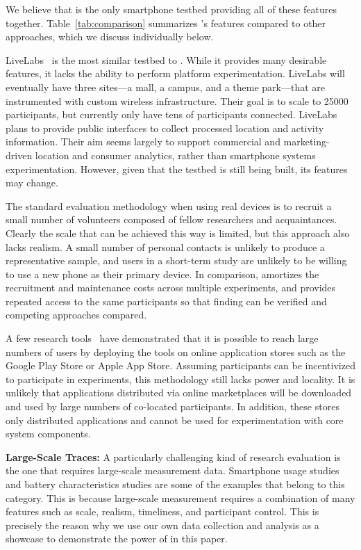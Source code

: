 We believe that \PhoneLab{} is the only smartphone testbed providing all of
these features together. Table~\ref{tab:comparison} summarizes \PhoneLab{}'s
features compared to other approaches, which we discuss individually below.

LiveLabs~\cite{livelabs} is the most similar testbed to \PhoneLab{}. While it
provides many desirable features, it lacks the ability to perform platform
experimentation. LiveLabs will eventually have three sites---a mall, a
campus, and a theme park---that are instrumented with custom wireless
infrastructure. Their goal is to scale to \num{25000} participants, but
currently only have tens of participants connected. LiveLabs plans to provide
public interfaces to collect processed location and activity information.
Their aim seems largely to support commercial and marketing-driven location
and consumer analytics, rather than smartphone systems experimentation.
However, given that the testbed is still being built, its features may
change.

The standard evaluation methodology when using real devices is to recruit a
small number of volunteers composed of fellow researchers and acquaintances.
Clearly the scale that can be achieved this way is limited, but this approach
also lacks realism. A small number of personal contacts is unlikely to
produce a representative sample, and users in a short-term study are unlikely
to be willing to use a new phone as their primary device. In comparison,
\PhoneLab{} amortizes the recruitment and maintenance costs across multiple
experiments, and provides repeated access to the same participants so that
finding can be verified and competing approaches compared.

A few research tools~\cite{huang:mobisys:2010, zhang:codes:2010} have
demonstrated that it is possible to reach large numbers of users by deploying
the tools on online application stores such as the Google Play Store or Apple
App Store. Assuming participants can be incentivized to participate in
experiments, this methodology still lacks power and locality. It is unlikely
that applications distributed via online marketplaces will be downloaded and
used by large numbers of co-located participants. In addition, these stores
only distributed applications and cannot be used for experimentation with
core system components.

{\bf Large-Scale Traces:} A particularly challenging kind of research evaluation
is the one that requires large-scale measurement data. Smartphone usage studies
and battery characteristics studies are some of the examples that belong to this
category. This is because large-scale measurement requires a combination of many
features such as scale, realism, timeliness, and participant control. This is
precisely the reason why we use our own data collection and analysis as a
showcase to demonstrate the power of \PhoneLab{} in this paper.

